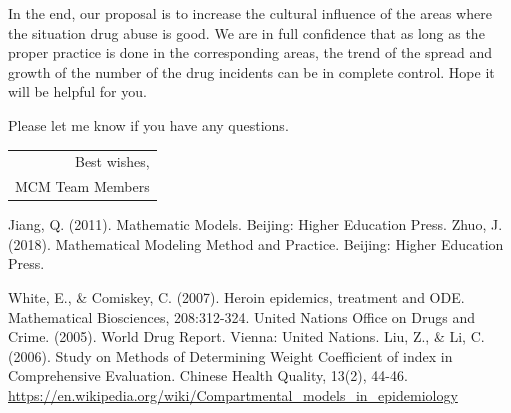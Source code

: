 \documentclass{mcmthesis}
\begin{document}
In the end, our proposal is to increase the cultural influence of the areas where the situation drug abuse is good. We are in full confidence that as long as the proper practice is done in the corresponding areas, the trend of the spread and growth of the number of the drug incidents can be in complete control. Hope it will be helpful for you.

Please let me know if you have any questions.
\begin{flushright}
  \begin{tabular}{r}
  Best wishes, \\
  MCM Team Members\\
  \end{tabular}
\end{flushright}
\newpage

\begin{thebibliography}{99}
 Jiang, Q. (2011). Mathematic Models. Beijing: Higher Education Press.
 Zhuo, J. (2018). Mathematical Modeling Method and Practice. Beijing: Higher Education Press.

 White, E., \& Comiskey, C. (2007). Heroin epidemics, treatment and ODE. Mathematical Biosciences, 208:312-324.
 United Nations Office on Drugs and Crime. (2005). World Drug Report. Vienna: United Nations.
 Liu, Z., \& Li, C. (2006). Study on Methods of Determining Weight Coefficient of index in Comprehensive Evaluation. Chinese Health Quality, 13(2), 44-46.
 \url{https://en.wikipedia.org/wiki/Compartmental_models_in_epidemiology}
\end{thebibliography}
\end{document}
